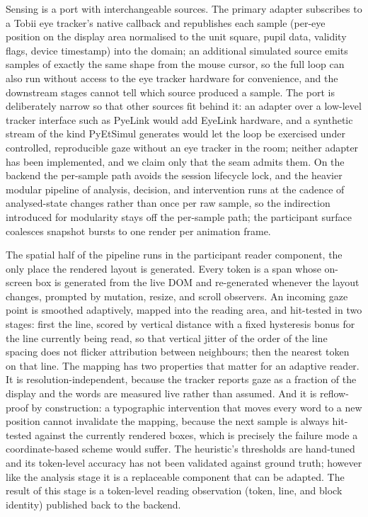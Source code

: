 Sensing is a port with interchangeable sources.
The primary adapter subscribes to a Tobii eye tracker's native callback and republishes each sample (per-eye position on the display area normalised to the unit square, pupil data, validity flags, device timestamp) into the domain; an additional simulated source emits samples of exactly the same shape from the mouse cursor, so the full loop can also run without access to the eye tracker hardware for convenience, and the downstream stages cannot tell which source produced a sample.
The port is deliberately narrow so that other sources fit behind it: an adapter over a low-level tracker interface such as PyeLink \cite{salari2026pyelink} would add EyeLink hardware, and a synthetic stream of the kind PyEtSimul \cite{salari2026pyetsimul} generates would let the loop be exercised under controlled, reproducible gaze without an eye tracker in the room; neither adapter has been implemented, and we claim only that the seam admits them.
On the backend the per-sample path avoids the session lifecycle lock, and the heavier modular pipeline of analysis, decision, and intervention runs at the cadence of analysed-state changes rather than once per raw sample, so the indirection introduced for modularity stays off the per-sample path; the participant surface coalesces snapshot bursts to one render per animation frame.

The spatial half of the pipeline runs in the participant reader component, the only place the rendered layout is generated.
Every token is a span whose on-screen box is generated from the live DOM and re-generated whenever the layout changes, prompted by mutation, resize, and scroll observers.
An incoming gaze point is smoothed adaptively, mapped into the reading area, and hit-tested in two stages: first the line, scored by vertical distance with a fixed hysteresis bonus for the line currently being read, so that vertical jitter of the order of the line spacing does not flicker attribution between neighbours; then the nearest token on that line.
The mapping has two properties that matter for an adaptive reader.
It is resolution-independent, because the tracker reports gaze as a fraction of the display and the words are measured live rather than assumed.
And it is reflow-proof by construction: a typographic intervention that moves every word to a new position cannot invalidate the mapping, because the next sample is always hit-tested against the currently rendered boxes, which is precisely the failure mode a coordinate-based scheme would suffer.
The heuristic's thresholds are hand-tuned and its token-level accuracy has not been validated against ground truth; however like the analysis stage it is a replaceable component that can be adapted.
The result of this stage is a token-level reading observation (token, line, and block identity) published back to the backend.

